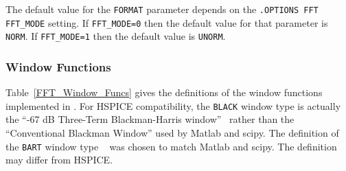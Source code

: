 The default value for the \texttt{FORMAT} parameter depends on the
\texttt{.OPTIONS FFT FFT\_MODE} setting.  If \texttt{FFT\_MODE=0} then
the default value for that parameter is {\tt NORM}. If \texttt{FFT\_MODE=1}
then the default value is {\tt UNORM}.

\subsubsection{Window Functions}
Table~\ref{FFT_Window_Funcs} gives the definitions of the window functions
implemented in \Xyce{}.  For HSPICE compatibility, the {\tt BLACK} window type
is actually the ``-67 dB Three-Term Blackman-Harris window''~\cite{Doerry2017}
rather than the ``Conventional Blackman Window'' used by Matlab and scipy.
The definition of the {\tt BART} window type ~\cite{oppenheimSchafer} was chosen
to match Matlab and scipy.  The \Xyce{} definition may differ from HSPICE.

